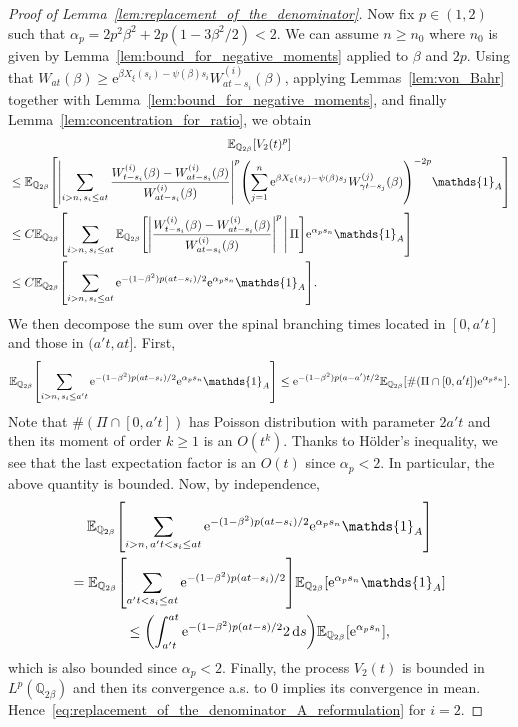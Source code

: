 \documentclass[AHL,Unicode,longabstracts,published]{cedram}
\newcommand{\e}{\mathrm{e}}
\renewcommand{\d}[1]{\mathop{}\!\mathrm{d}#1}
\newcommand{\E}{\mathbb{E}}
\newcommand{\Q}{\mathbb{Q}}
\newcommand\1{\mathds{1}}
\let\originalleft\left
\let\originalright\right
\renewcommand{\left}{\mathopen{}\mathclose\bgroup\originalleft}
\renewcommand{\right}{\aftergroup\egroup\originalright}
\begin{document}
\begin{proof}[Proof of Lemma~\ref{lem:replacement_of_the_denominator}]
\pagebreak
Now fix $p \in (1, 2)$ such that $\alpha_p = 2p^2\beta^2 + 2p(1 - 3\beta^2/2) < 2$. We can assume $n \geq n_0$ where $n_0$ is given by Lemma~\ref{lem:bound_for_negative_moments} applied to $\beta$ and $2p$. Using that $W_{at}(\beta) \geq \e^{\beta X_\xi(s_i) - \psi(\beta)s_i} W_{at - s_i}^{(i)}(\beta)$, applying Lemmas~\ref{lem:von_Bahr} together with Lemma~\ref{lem:bound_for_negative_moments}, and finally Lemma~\ref{lem:concentration_for_ratio}, we obtain
\begin{multline*}
 \E_{\Q_{2 \beta}} \left[V_2(t)^p \right]  \\
\begin{aligned}
&\leq \E_{\Q_{2 \beta}} \left[\left| \sum_{{i > n,\, s_i \leq at}} \frac{W_{t - s_i}^{(i)}(\beta) - W_{at - s_i}^{(i)}(\beta)}{W_{at - s_i}^{(i)}(\beta)} \right|^p \left(\sum_{j = 1}^n \e^{\beta X_\xi(s_j) - \psi(\beta)s_j} W_{\gamma t - s_j}^{(j)}(\beta) \right)^{-2p} \1_A \right]  \\
&\leq C \E_{\Q_{2 \beta}} \left[\sum_{{i > n,\, s_i \leq at}} \E_{\Q_{2 \beta}} \left[\left| \frac{W_{t - s_i}^{(i)}(\beta) - W_{at - s_i}^{(i)}(\beta)}{W_{at - s_i}^{(i)}(\beta)} \right|^p \,\middle|\, \Pi \right] \e^{\alpha_p s_n} \1_A \right]  \\
&\leq C \E_{\Q_{2 \beta}} \left[\sum_{i > n,\, s_i \leq at} \e^{-(1 - \beta^2)p(at - s_i)/2} \e^{\alpha_p s_n} \1_A \right]. 
\end{aligned}
\end{multline*}
We then decompose the sum over the spinal branching times located in $[0, a't]$ and those in $(a't, at]$. First,
\begin{equation*}
\E_{\Q_{2 \beta}} \left[\sum_{{i > n,\, s_i \leq a't}} \e^{-(1 - \beta^2)p(at - s_i)/2} \e^{\alpha_p s_n} \1_A \right] \leq \e^{-(1 - \beta^2)p(a - a')t/2} \E_{\Q_{2 \beta}} \left[\#(\Pi \cap [0, a't]) \e^{\alpha_p s_n} \right].
\end{equation*}
Note that $\#(\Pi \cap [0, a't])$ has Poisson distribution with parameter $2a't$ and then its moment of order $k \geq 1$ is an $O(t^k)$. Thanks to H\"older's inequality, we see that the last expectation factor is an $O(t)$ since $\alpha_p < 2$. In particular, the above quantity is bounded. Now, by independence,
\begin{multline*}
\E_{\Q_{2 \beta}} \left[\sum_{i > n,\, a't < s_i \leq at} \e^{-(1 - \beta^2)p(at - s_i)/2} \e^{\alpha_p s_n} \1_A \right]  \\
= \E_{\Q_{2 \beta}} \left[\sum_{a't < s_i \leq at} \e^{-(1 - \beta^2)p(at - s_i)/2} \right] \E_{\Q_{2 \beta}} \left[\e^{\alpha_p s_n} \1_A \right]  \\
\leq \left(\int_{a't}^{at} \e^{-(1 - \beta^2)p(at - s)/2} 2\d{s} \right) \E_{\Q_{2 \beta}} \left[\e^{\alpha_p s_n} \right], 
\end{multline*}
which is also bounded since $\alpha_p < 2$. Finally, the process $V_2(t)$ is bounded in $L^p(\Q_{2\beta})$ and then its convergence a.s. to $0$ implies its convergence in mean. Hence~\eqref{eq:replacement_of_the_denominator_A_reformulation} for $i = 2$.


\end{proof}
\end{document}
